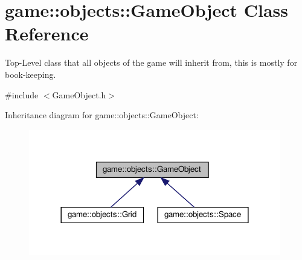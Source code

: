 \hypertarget{classgame_1_1objects_1_1GameObject}{}\section{game\+:\+:objects\+:\+:Game\+Object Class Reference}
\label{classgame_1_1objects_1_1GameObject}


Top-\/\+Level class that all objects of the game will inherit from, this is mostly for book-\/keeping.  




{\ttfamily \#include $<$Game\+Object.\+h$>$}



Inheritance diagram for game\+:\+:objects\+:\+:Game\+Object\+:
\nopagebreak
\begin{figure}[H]
\begin{center}
\leavevmode
\includegraphics[width=312pt]{classgame_1_1objects_1_1GameObject__inherit__graph}
\end{center}
\end{figure}
